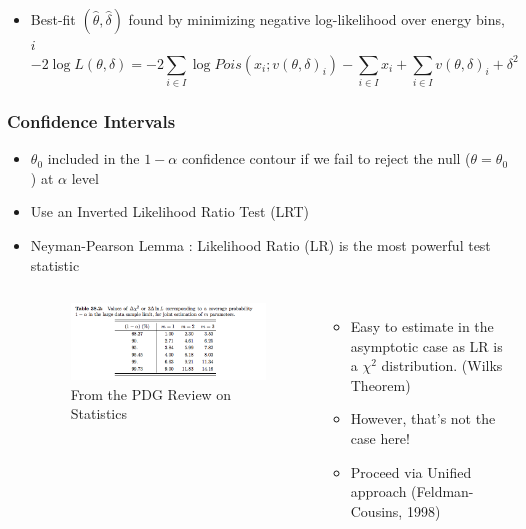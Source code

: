 \documentclass[9pt, aspectratio=169]{beamer}
\begin{document}
\begin{frame}
\begin{itemize}
    \item Best-fit $(\hat{\theta}, \hat{\delta})$ found by minimizing negative log-likelihood over energy bins, $i$ 
      \begin{equation*}
        -2\log L(\theta, \delta) = -2\sum_{i\in I} \log Pois(x_i;v(\theta, \delta)_i) - \sum_{i \in I}x_i + \sum_{i \in I}v(\theta, \delta)_i +\delta^2
      \end{equation*}
      \end{itemize}
\end{frame}

\begin{frame}
  \frametitle{Confidence Intervals}
  \begin{itemize}
    \item $\theta_{0}$ included in the $1-\alpha$ confidence contour if we fail to reject the null ($\theta = \theta_{0}$) at $\alpha$ level
    \item Use an Inverted Likelihood Ratio Test (LRT)
    \item Neyman-Pearson Lemma : Likelihood Ratio (LR) is the most powerful test statistic
      \bigskip
      \begin{columns}
        \begin{figure}
        \includegraphics[scale=0.33]{graphics/wilks.png}
        \caption{From the PDG Review on Statistics}
        \end{figure}
        \begin{itemize}
    \item Easy to estimate in the asymptotic case as LR is a $\chi^{2}$ distribution. (Wilks Theorem)
    \item However, that's not the case here! 
    \item Proceed via Unified approach (Feldman-Cousins, 1998)
        \end{itemize}
      \end{columns}
  \end{itemize}
\end{frame}
\end{document}
